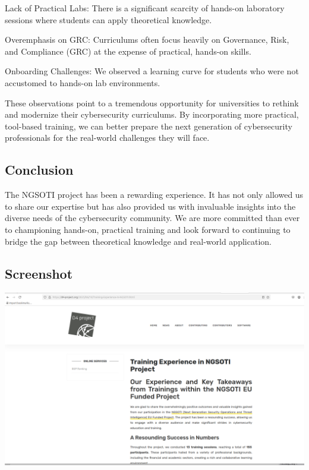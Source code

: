 \documentclass[10pt,a4paper]{report}
\begin{document}
\begin{description}
    \item {Lack of Practical Labs}: There is a significant scarcity of
hands-on laboratory sessions where students can apply theoretical knowledge.
    \item {Overemphasis on GRC}: Curriculums often focus heavily on Governance,
Risk, and Compliance (GRC) at the expense of practical, hands-on skills.
    \item {Onboarding Challenges}: We observed a learning curve for students
who were not accustomed to hands-on lab environments.
\end{description}

These observations point to a tremendous opportunity for universities to
rethink and modernize their cybersecurity curriculums. By incorporating more
practical, tool-based training, we can better prepare the next generation of
cybersecurity professionals for the real-world challenges they will face.

\subsection*{Conclusion}
The NGSOTI project has been a rewarding experience. It has not only allowed
us to share our expertise but has also provided us with invaluable insights
into the diverse needs of the cybersecurity community. We are more committed
than ever to championing hands-on, practical training and look forward to
continuing to bridge the gap between theoretical knowledge and real-world
application.

\subsection*{Screenshot}

\includegraphics[scale=0.3]{screenshot.png}
\end{document}
